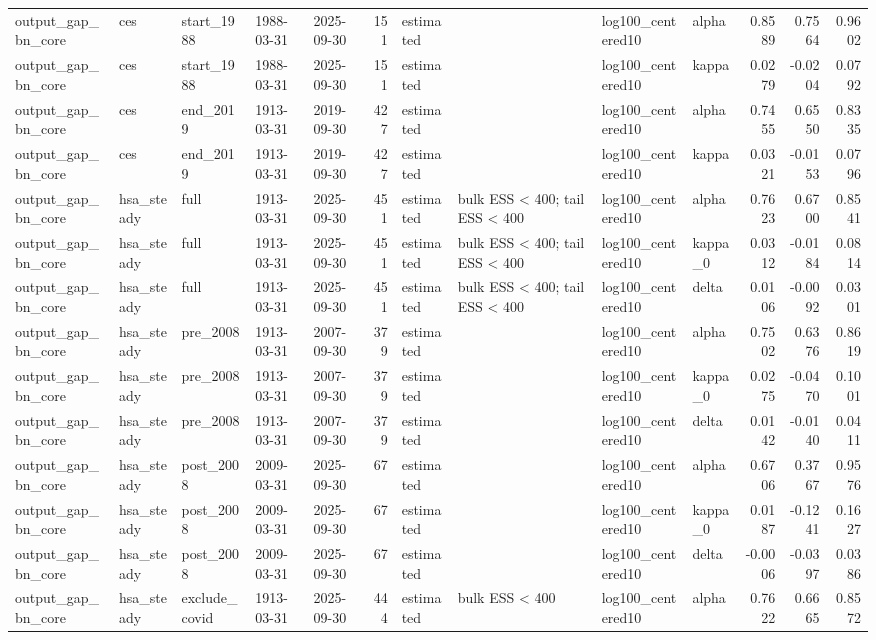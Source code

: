 \begin{tabular}{lllllrllllrrr}
output\_gap\_bn\_core & ces & start\_1988 & 1988-03-31 & 2025-09-30 & 151 & estimated &  & log100\_centered10 & alpha & 0.8589 & 0.7564 & 0.9602 \\
output\_gap\_bn\_core & ces & start\_1988 & 1988-03-31 & 2025-09-30 & 151 & estimated &  & log100\_centered10 & kappa & 0.0279 & -0.0204 & 0.0792 \\
output\_gap\_bn\_core & ces & end\_2019 & 1913-03-31 & 2019-09-30 & 427 & estimated &  & log100\_centered10 & alpha & 0.7455 & 0.6550 & 0.8335 \\
output\_gap\_bn\_core & ces & end\_2019 & 1913-03-31 & 2019-09-30 & 427 & estimated &  & log100\_centered10 & kappa & 0.0321 & -0.0153 & 0.0796 \\
output\_gap\_bn\_core & hsa\_steady & full & 1913-03-31 & 2025-09-30 & 451 & estimated & bulk ESS < 400; tail ESS < 400 & log100\_centered10 & alpha & 0.7623 & 0.6700 & 0.8541 \\
output\_gap\_bn\_core & hsa\_steady & full & 1913-03-31 & 2025-09-30 & 451 & estimated & bulk ESS < 400; tail ESS < 400 & log100\_centered10 & kappa\_0 & 0.0312 & -0.0184 & 0.0814 \\
output\_gap\_bn\_core & hsa\_steady & full & 1913-03-31 & 2025-09-30 & 451 & estimated & bulk ESS < 400; tail ESS < 400 & log100\_centered10 & delta & 0.0106 & -0.0092 & 0.0301 \\
output\_gap\_bn\_core & hsa\_steady & pre\_2008 & 1913-03-31 & 2007-09-30 & 379 & estimated &  & log100\_centered10 & alpha & 0.7502 & 0.6376 & 0.8619 \\
output\_gap\_bn\_core & hsa\_steady & pre\_2008 & 1913-03-31 & 2007-09-30 & 379 & estimated &  & log100\_centered10 & kappa\_0 & 0.0275 & -0.0470 & 0.1001 \\
output\_gap\_bn\_core & hsa\_steady & pre\_2008 & 1913-03-31 & 2007-09-30 & 379 & estimated &  & log100\_centered10 & delta & 0.0142 & -0.0140 & 0.0411 \\
output\_gap\_bn\_core & hsa\_steady & post\_2008 & 2009-03-31 & 2025-09-30 & 67 & estimated &  & log100\_centered10 & alpha & 0.6706 & 0.3767 & 0.9576 \\
output\_gap\_bn\_core & hsa\_steady & post\_2008 & 2009-03-31 & 2025-09-30 & 67 & estimated &  & log100\_centered10 & kappa\_0 & 0.0187 & -0.1241 & 0.1627 \\
output\_gap\_bn\_core & hsa\_steady & post\_2008 & 2009-03-31 & 2025-09-30 & 67 & estimated &  & log100\_centered10 & delta & -0.0006 & -0.0397 & 0.0386 \\
output\_gap\_bn\_core & hsa\_steady & exclude\_covid & 1913-03-31 & 2025-09-30 & 444 & estimated & bulk ESS < 400 & log100\_centered10 & alpha & 0.7622 & 0.6665 & 0.8572 \\

\end{tabular}
